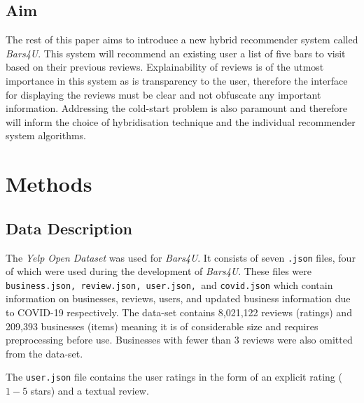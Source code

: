 \documentclass[conference]{IEEEtran}
\begin{document}
\subsection{Aim}
The rest of this paper aims to introduce a new hybrid recommender system called \textit{Bars4U}. This system will recommend an existing user a list of five bars to visit based on their previous reviews. Explainability of reviews is of the utmost importance in this system as is transparency to the user, therefore the interface for displaying the reviews must be clear and not obfuscate any important information. Addressing the cold-start problem is also paramount and therefore will inform the choice of hybridisation technique and the individual recommender system algorithms.


\section{Methods}
\subsection{Data Description}
The \textit{Yelp Open Dataset}\cite{b9} was used for \textit{Bars4U}. It consists of seven \texttt{.json} files, four of which were used during the development of \textit{Bars4U}. These files were \texttt{business.json, review.json, user.json, }and \texttt{covid.json} which contain information on businesses, reviews, users, and updated business information due to COVID-19 respectively. The data-set contains 8,021,122 reviews (ratings) and 209,393 businesses (items) meaning it is of considerable size and requires preprocessing before use. Businesses with fewer than 3 reviews were also omitted from the data-set.
\par The \texttt{user.json} file contains the user ratings in the form of an explicit rating ($1-5$ stars) and a textual review.
\end{document}
